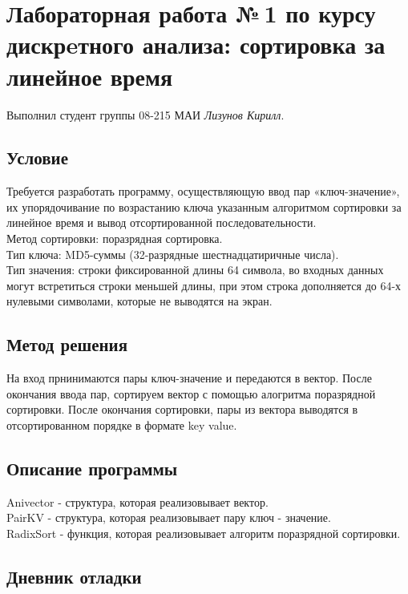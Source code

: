 \documentclass[12pt]{article}
\begin{document}
\section*{Лабораторная работа №\,1 по курсу дискрeтного анализа: сортировка за линейное время}

Выполнил студент группы 08-215 МАИ \textit{Лизунов Кирилл}.

\subsection*{Условие}


Требуется разработать программу, осуществляющую ввод пар «ключ-значение», их упорядочивание по возрастанию ключа указанным алгоритмом сортировки за линейное время и вывод отсортированной последовательности.\\
Метод сортировки: поразрядная сортировка.\\
Тип ключа: MD5-суммы (32-разрядные шестнадцатиричные числа).\\
Тип значения: строки фиксированной длины 64 символа, во входных данных могут встретиться строки меньшей длины, при этом строка дополняется до 64-х нулевыми символами, которые не выводятся на экран.


\subsection*{Метод решения}

На вход прнинимаются пары ключ-значение и передаются в вектор. После окончания ввода пар, сортируем вектор с помощью алогритма поразрядной сортировки. После окончания сортировки, пары из вектора выводятся в отсортированном порядке в формате key  value.

\subsection*{Описание программы}

Anivector - структура, которая реализовывает вектор.\\
PairKV - структура, которая реализовывает пару ключ - значение.\\
RadixSort - функция, которая реализовывает алгоритм поразрядной сортировки.

\subsection*{Дневник отладки}
\end{document}
